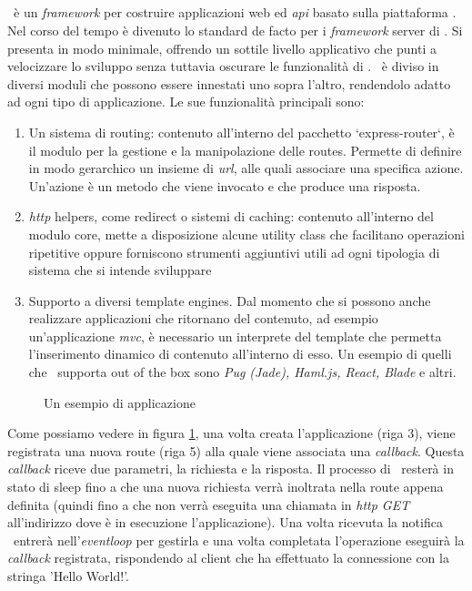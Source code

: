 \subsection{\expressjs}
\expressjs~è un \textit{\gls{framework}} per costruire applicazioni web ed \textit{\acrshort{api}} basato sulla piattaforma \nodejs. Nel corso del tempo è divenuto lo standard de facto per i \textit{\gls{framework}} server di \nodejs. 
Si presenta in modo minimale, offrendo un sottile livello applicativo che punti a velocizzare lo sviluppo senza tuttavia oscurare le funzionalità di \nodejs. \expressjs~è diviso in diversi moduli che possono essere innestati uno sopra l'altro, rendendolo adatto ad ogni tipo di applicazione.  
Le sue funzionalità principali sono:
\begin{enumerate}[label=(\alph*)]
	\item Un sistema di routing: contenuto all'interno del pacchetto `express-router`, è il modulo per la gestione e la manipolazione delle routes. Permette di definire in modo gerarchico un insieme di \textit{\acrshort{url}}, alle quali associare una specifica azione. Un'azione è un metodo che viene invocato e che produce una risposta.
	\item \textit{\acrshort{http}} helpers, come redirect o sistemi di caching: contenuto all'interno del modulo core, mette a disposizione alcune utility class che facilitano operazioni ripetitive oppure forniscono strumenti aggiuntivi utili ad ogni tipologia di sistema che si intende sviluppare
	\item Supporto a diversi template engines. Dal momento che si possono anche realizzare applicazioni che ritornano del contenuto, ad esempio un'applicazione \textit{\gls{mvc}}, è necessario un interprete del template che permetta l'inserimento dinamico di contenuto all'interno di esso. Un esempio di quelli che \expressjs~supporta out of the box sono \textit{Pug (Jade), Haml.js, React, Blade} e altri.
\end{enumerate}
\begin{figure}[!h] 
	\centering    
	
	\caption[Esempio di applicazione \expressjs]{Un esempio di applicazione \expressjs}
	\label{fig:expressjs-example}
\end{figure}
Come possiamo vedere in figura \ref{fig:expressjs-example}, una volta creata l'applicazione (riga 3), viene registrata una nuova route (riga 5) alla quale viene associata una \textit{\gls{callback}}. Questa \textit{\gls{callback}} riceve due parametri, la richiesta e la risposta. Il processo di \nodejs~resterà in stato di sleep fino a che una nuova richiesta verrà inoltrata nella route appena definita (quindi fino a che non verrà eseguita una chiamata in \textit{\acrshort{http} GET} all'indirizzo dove è in esecuzione l'applicazione). Una volta ricevuta la notifica \nodejs~entrerà nell'\textit{\gls{eventloop}} per gestirla e una volta completata l'operazione eseguirà la \textit{\gls{callback}} registrata, rispondendo al client che ha effettuato la connessione con la stringa 'Hello World!'.

